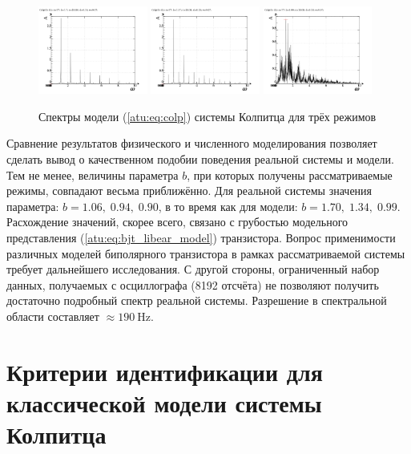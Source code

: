 \begin{figure}[htb!]
 \centerline{
   \includegraphics[width=0.32\textwidth]{p/mod/colp_f-p_f_b=1x70.png}
   \includegraphics[width=0.32\textwidth]{p/mod/colp_f-p_f_b=1x37.png}
   \includegraphics[width=0.32\textwidth]{p/mod/colp_f-p_f_b=0x99.png}
 }
  \caption{Спектры модели (\ref{atu:eq:colp}) системы Колпитца для трёх режимов}
  \label{atu:f:colp_model_f}
\end{figure}

Сравнение результатов физического и численного моделирования позволяет сделать вывод
о качественном подобии поведения реальной системы и модели.
Тем не менее, величины параметра $b$, при которых получены
рассматриваемые режимы, совпадают весьма приближённо.
Для реальной системы значения параметра: $b = 1.06, \; 0.94, \; 0.90 $, в то время как
для модели: $b = 1.70, \; 1.34, \; 0.99 $.
Расхождение значений, скорее всего, связано с грубостью модельного представления (\ref{atu:eq:bjt_libear_model}) транзистора.
Вопрос применимости различных моделей биполярного транзистора в рамках рассматриваемой системы
требует дальнейшего исследования.
С другой стороны, ограниченный набор данных, получаемых с осциллографа  (8192 отсчёта) не позволяют
получить достаточно подробный спектр реальной системы.
Разрешение в спектральной области составляет $ \approx \SI{190}{\hertz}$.


\section{Критерии идентификации для классической модели системы Колпитца}  %

